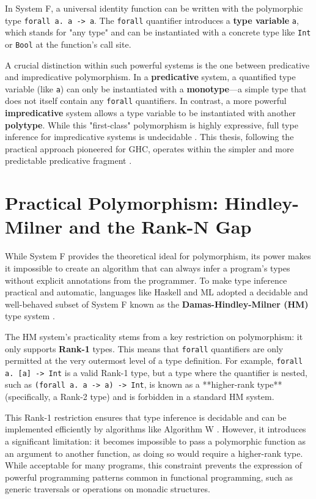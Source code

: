 In System F, a universal identity function can be written with the polymorphic type \texttt{forall a. a -> a}. The \texttt{forall} quantifier introduces a \textbf{type variable} \texttt{a}, which stands for "any type" and can be instantiated with a concrete type like \texttt{Int} or \texttt{Bool} at the function's call site.

A crucial distinction within such powerful systems is the one between predicative and impredicative polymorphism. In a \textbf{predicative} system, a quantified type variable (like \texttt{a}) can only be instantiated with a \textbf{monotype}---a simple type that does not itself contain any \texttt{forall} quantifiers. In contrast, a more powerful \textbf{impredicative} system allows a type variable to be instantiated with another \textbf{polytype}. While this "first-class" polymorphism is highly expressive, full type inference for impredicative systems is undecidable \cite{wells-typability-1999, serrano-quick-2020}. This thesis, following the practical approach pioneered for GHC, operates within the simpler and more predictable predicative fragment \cite{jones-practical-2007}.

\section{Practical Polymorphism: Hindley-Milner and the Rank-N Gap}
\label{sec:LitReviewHM}

While System F provides the theoretical ideal for polymorphism, its power makes it impossible to create an algorithm that can always infer a program's types without explicit annotations from the programmer. To make type inference practical and automatic, languages like Haskell and ML adopted a decidable and well-behaved subset of System F known as the \textbf{Damas-Hindley-Milner (HM)} type system \cite{damas-milner}.

The HM system's practicality stems from a key restriction on polymorphism: it only supports \textbf{Rank-1} types. This means that \texttt{forall} quantifiers are only permitted at the very outermost level of a type definition. For example, \texttt{forall a. [a] -> Int} is a valid Rank-1 type, but a type where the quantifier is nested, such as \texttt{(forall a. a -> a) -> Int}, is known as a **higher-rank type** (specifically, a Rank-2 type) and is forbidden in a standard HM system.

This Rank-1 restriction ensures that type inference is decidable and can be implemented efficiently by algorithms like Algorithm W \cite{jones-practical-2007}. However, it introduces a significant limitation: it becomes impossible to pass a polymorphic function as an argument to another function, as doing so would require a higher-rank type. While acceptable for many programs, this constraint prevents the expression of powerful programming patterns common in functional programming, such as generic traversals or operations on monadic structures.

